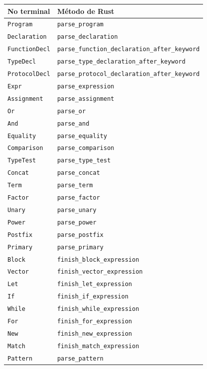 \documentclass[12pt, a4paper]{article}
\begin{document}
\begin{center}
\begin{longtable}{@{}l l@{}}
\toprule
\textbf{No terminal} & \textbf{Método de Rust} \\
\midrule
\endhead
\texttt{Program} & \texttt{parse\_program} \\
\texttt{Declaration} & \texttt{parse\_declaration} \\
\texttt{FunctionDecl} & \texttt{parse\_function\_declaration\_after\_keyword} \\
\texttt{TypeDecl} & \texttt{parse\_type\_declaration\_after\_keyword} \\
\texttt{ProtocolDecl} & \texttt{parse\_protocol\_declaration\_after\_keyword} \\
\texttt{Expr} & \texttt{parse\_expression} \\
\texttt{Assignment} & \texttt{parse\_assignment} \\
\texttt{Or} & \texttt{parse\_or} \\
\texttt{And} & \texttt{parse\_and} \\
\texttt{Equality} & \texttt{parse\_equality} \\
\texttt{Comparison} & \texttt{parse\_comparison} \\
\texttt{TypeTest} & \texttt{parse\_type\_test} \\
\texttt{Concat} & \texttt{parse\_concat} \\
\texttt{Term} & \texttt{parse\_term} \\
\texttt{Factor} & \texttt{parse\_factor} \\
\texttt{Unary} & \texttt{parse\_unary} \\
\texttt{Power} & \texttt{parse\_power} \\
\texttt{Postfix} & \texttt{parse\_postfix} \\
\texttt{Primary} & \texttt{parse\_primary} \\
\texttt{Block} & \texttt{finish\_block\_expression} \\
\texttt{Vector} & \texttt{finish\_vector\_expression} \\
\texttt{Let} & \texttt{finish\_let\_expression} \\
\texttt{If} & \texttt{finish\_if\_expression} \\
\texttt{While} & \texttt{finish\_while\_expression} \\
\texttt{For} & \texttt{finish\_for\_expression} \\
\texttt{New} & \texttt{finish\_new\_expression} \\
\texttt{Match} & \texttt{finish\_match\_expression} \\
\texttt{Pattern} & \texttt{parse\_pattern} \\
\bottomrule
\end{longtable}
\end{center}
\end{document}
